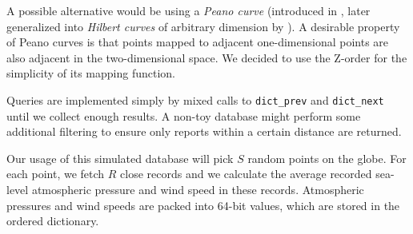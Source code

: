 A possible alternative would be using a \emph{Peano curve}
(introduced in \cite{peano-curve}, later generalized into
\emph{Hilbert curves} of arbitrary dimension by \cite{hilbert-curve}).
A desirable property of Peano curves is that points mapped to adjacent
one-dimensional points are also adjacent in the two-dimensional space.
We decided to use the Z-order for the simplicity of its mapping function.

Queries are implemented simply by mixed calls to \texttt{dict\_prev} and
\texttt{dict\_next} until we collect enough results. A non-toy database might
perform some additional filtering to ensure only reports within a certain
distance are returned.

Our usage of this simulated database will pick $S$ random points on the globe.
For each point, we fetch $R$ close records and we calculate the average
recorded sea-level atmospheric pressure and wind speed in these records.
Atmospheric pressures and wind speeds are packed into 64-bit values, which
are stored in the ordered dictionary.

